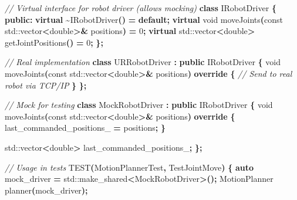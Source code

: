 \documentclass[
]{article}
\newenvironment{Shaded}{\begin{snugshade}}{\end{snugshade}}
\newcommand{\AttributeTok}[1]{\textcolor[rgb]{0.13,0.29,0.53}{#1}}
\newcommand{\BuiltInTok}[1]{#1}
\newcommand{\CommentTok}[1]{\textcolor[rgb]{0.56,0.35,0.01}{\textit{#1}}}
\newcommand{\ControlFlowTok}[1]{\textcolor[rgb]{0.13,0.29,0.53}{\textbf{#1}}}
\newcommand{\DataTypeTok}[1]{\textcolor[rgb]{0.13,0.29,0.53}{#1}}
\newcommand{\DecValTok}[1]{\textcolor[rgb]{0.00,0.00,0.81}{#1}}
\newcommand{\KeywordTok}[1]{\textcolor[rgb]{0.13,0.29,0.53}{\textbf{#1}}}
\newcommand{\NormalTok}[1]{#1}
\newcommand{\OperatorTok}[1]{\textcolor[rgb]{0.81,0.36,0.00}{\textbf{#1}}}
\newcommand{\VariableTok}[1]{\textcolor[rgb]{0.00,0.00,0.00}{#1}}
\begin{document}
\begin{Shaded}
\begin{Highlighting}[]
\CommentTok{// Virtual interface for robot driver (allows mocking)}
\KeywordTok{class}\NormalTok{ IRobotDriver }\OperatorTok{\{}
\KeywordTok{public}\OperatorTok{:}
    \KeywordTok{virtual} \OperatorTok{\textasciitilde{}}\NormalTok{IRobotDriver}\OperatorTok{()} \OperatorTok{=} \ControlFlowTok{default}\OperatorTok{;}
    \KeywordTok{virtual} \DataTypeTok{void}\NormalTok{ moveJoints}\OperatorTok{(}\AttributeTok{const} \BuiltInTok{std::}\NormalTok{vector}\OperatorTok{\textless{}}\DataTypeTok{double}\OperatorTok{\textgreater{}\&}\NormalTok{ positions}\OperatorTok{)} \OperatorTok{=} \DecValTok{0}\OperatorTok{;}
    \KeywordTok{virtual} \BuiltInTok{std::}\NormalTok{vector}\OperatorTok{\textless{}}\DataTypeTok{double}\OperatorTok{\textgreater{}}\NormalTok{ getJointPositions}\OperatorTok{()} \OperatorTok{=} \DecValTok{0}\OperatorTok{;}
\OperatorTok{\};}

\CommentTok{// Real implementation}
\KeywordTok{class}\NormalTok{ URRobotDriver }\OperatorTok{:} \KeywordTok{public}\NormalTok{ IRobotDriver }\OperatorTok{\{}
    \DataTypeTok{void}\NormalTok{ moveJoints}\OperatorTok{(}\AttributeTok{const} \BuiltInTok{std::}\NormalTok{vector}\OperatorTok{\textless{}}\DataTypeTok{double}\OperatorTok{\textgreater{}\&}\NormalTok{ positions}\OperatorTok{)} \KeywordTok{override} \OperatorTok{\{}
        \CommentTok{// Send to real robot via TCP/IP}
    \OperatorTok{\}}
\OperatorTok{\};}

\CommentTok{// Mock for testing}
\KeywordTok{class}\NormalTok{ MockRobotDriver }\OperatorTok{:} \KeywordTok{public}\NormalTok{ IRobotDriver }\OperatorTok{\{}
    \DataTypeTok{void}\NormalTok{ moveJoints}\OperatorTok{(}\AttributeTok{const} \BuiltInTok{std::}\NormalTok{vector}\OperatorTok{\textless{}}\DataTypeTok{double}\OperatorTok{\textgreater{}\&}\NormalTok{ positions}\OperatorTok{)} \KeywordTok{override} \OperatorTok{\{}
        \VariableTok{last\_commanded\_positions\_} \OperatorTok{=}\NormalTok{ positions}\OperatorTok{;}
    \OperatorTok{\}}

    \BuiltInTok{std::}\NormalTok{vector}\OperatorTok{\textless{}}\DataTypeTok{double}\OperatorTok{\textgreater{}} \VariableTok{last\_commanded\_positions\_}\OperatorTok{;}
\OperatorTok{\};}

\CommentTok{// Usage in tests}
\NormalTok{TEST}\OperatorTok{(}\NormalTok{MotionPlannerTest}\OperatorTok{,}\NormalTok{ TestJointMove}\OperatorTok{)} \OperatorTok{\{}
    \KeywordTok{auto}\NormalTok{ mock\_driver }\OperatorTok{=} \BuiltInTok{std::}\NormalTok{make\_shared}\OperatorTok{\textless{}}\NormalTok{MockRobotDriver}\OperatorTok{\textgreater{}();}
\NormalTok{    MotionPlanner planner}\OperatorTok{(}\NormalTok{mock\_driver}\OperatorTok{);}


\end{Highlighting}
\end{Shaded}
\end{document}
